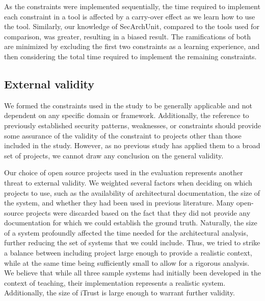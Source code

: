 As the constraints were implemented sequentially, the time required to implement each constraint in a tool is affected by a carry-over effect as we learn how to use the tool. Similarly, our knowledge of SecArchUnit, compared to the tools used for comparison, was greater, resulting in a biased result. The ramifications of both are minimized by excluding the first two constraints as a learning experience, and then considering the total time required to implement the remaining constraints.

\subsection{External validity}

We formed the constraints used in the study to be generally applicable and not dependent on any specific domain or framework. Additionally, the reference to previously established security patterns, weaknesses, or constraints should provide some assurance of the validity of the constraint to projects other than those included in the study. However, as no previous study has applied them to a broad set of projects, we cannot draw any conclusion on the general validity. 

Our choice of open source projects used in the evaluation represents another threat to external validity. We weighted several factors when deciding on which projects to use, such as the availability of architectural documentation, the size of the system, and whether they had been used in previous literature. Many open-source projects were discarded based on the fact that they did not provide any documentation for which we could establish the ground truth. Naturally, the size of a system profoundly affected the time needed for the architectural analysis, further reducing the set of systems that we could include. Thus, we tried to strike a balance between including project large enough to provide a realistic context, while at the same time being sufficiently small to allow for a rigorous analysis. We believe that while all three sample systems had initially been developed in the context of teaching, their implementation represents a realistic system. Additionally, the size of iTrust is large enough to warrant further validity.

